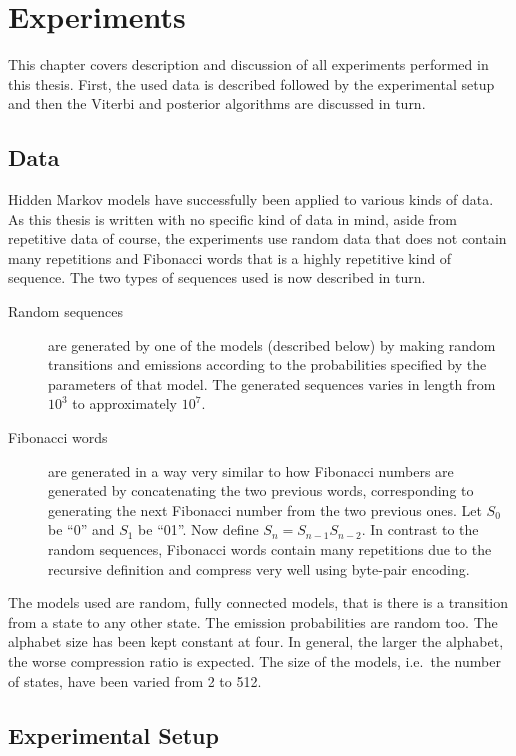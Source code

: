 \chapter{Experiments}
\label{cha:experiments}

This chapter covers description and discussion of all experiments performed in
this thesis. First, the used data is described followed by the experimental
setup and then the Viterbi and posterior algorithms are discussed in turn.

\section{Data}

Hidden Markov models have successfully been applied to various kinds of
data.  As this thesis is written with no specific kind of data in mind, aside
from repetitive data of course, the experiments use random data that does not
contain many repetitions and Fibonacci words that is a highly repetitive kind
of sequence.  The two types of sequences used is now described in turn.

\begin{description}
\item[Random sequences] are generated by one of the models (described below) by
  making random transitions and emissions according to the probabilities
  specified by the parameters of that model.  The generated sequences varies in
  length from $10^3$ to approximately $10^7$.
\item[Fibonacci words] are generated in a way very similar to how Fibonacci
  numbers are generated by concatenating the two previous words, corresponding
  to generating the next Fibonacci number from the two previous ones. Let $S_0$
  be ``0'' and $S_1$ be ``01''. Now define $S_n=S_{n-1}S_{n-2}$. In contrast to
  the random sequences, Fibonacci words contain many repetitions due to the
  recursive definition and compress very well using byte-pair encoding.
\end{description}

The models used are random, fully connected models, that is there is a
transition from a state to any other state. The emission probabilities are
random too. The alphabet size has been kept constant at four. In general, the
larger the alphabet, the worse compression ratio is expected. The size of the
models, i.e.\ the number of states, have been varied from 2 to 512.

\section{Experimental Setup}

